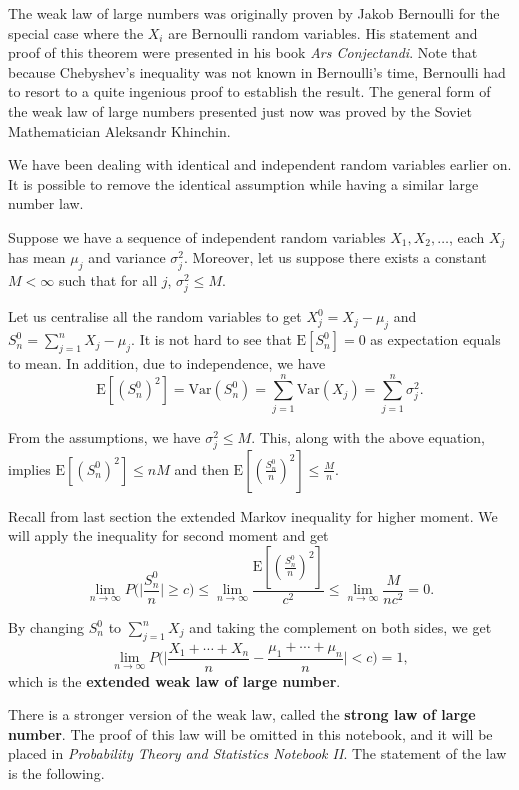 \documentclass[11pt, a4paper, oneside]{book}
\theoremstyle{definition}
\newcommand{\var}[1]{\text{Var}(#1)}
\newcommand{\E}[1]{\text{E}[#1]}
\begin{document}
\noindent The weak law of large numbers was originally proven by Jakob Bernoulli for the special case where the $X_i$ are Bernoulli random variables. His statement and proof of this theorem were presented in his book \emph{Ars Conjectandi}. Note that because Chebyshev’s inequality was not known in Bernoulli’s time, Bernoulli had to resort to a quite ingenious proof to establish the result. The general form of the weak law of large numbers presented just now was proved by the Soviet Mathematician Aleksandr Khinchin.

\noindent We have been dealing with identical and independent random variables earlier on. It is possible to remove the identical assumption while having a similar large number law. 

\noindent Suppose we have a sequence of independent random variables $X_1, X_2, \dots$, each $X_j$ has mean $\mu_j$ and variance $\sigma^2_j$. Moreover, let us suppose there exists a constant $M < \infty$ such that for all $j$, $\sigma^2_j \le M$.

\noindent Let us centralise all the random variables to get $X_j^0 = X_j - \mu_j$ and $S_n^0 =\sum_{j=1}^n X_j - \mu_j$. It is not hard to see that $\E{S_n^0} = 0$ as expectation equals to mean. In addition, due to independence, we have\[
\E{(S_n^0)^2} = \var{S_n^0} = \sum_{j=1}^n \var{X_j} = \sum_{j=1}^n \sigma^2_j.
\]

\noindent From the assumptions, we have $\sigma^2_j \le M$. This, along with the above equation, implies $\E{(S_n^0)^2} \le nM$ and then $\E{(\frac{S_n^0}{n})^2} \le \frac{M}{n}$.

\noindent Recall from last section the extended Markov inequality for higher moment. We will apply the inequality for second moment and get\[
\lim_{n \to \infty} P\Big( \Big\vert \frac{S_n^0}{n} \Big\vert \ge c \Big) \le \lim_{n \to \infty} \frac{\E{(\frac{S_n^0}{n})^2}}{c^2} \le \lim_{n \to \infty} \frac{M}{nc^2} = 0.
\]

\noindent By changing $S_n^0$ to $\sum_{j=1}^n X_j$ and taking the complement on both sides, we get \[
\lim_{n \to \infty} P\Big(\Big\vert \frac{X_1 + \cdots + X_n}{n} - \frac{\mu_1 + \cdots + \mu_n}{n} \Big\vert < c\Big) = 1,
\] 
which is the \textbf{extended weak law of large number}. 

\noindent There is a stronger version of the weak law, called the \textbf{strong law of large number}. The proof of this law will be omitted in this notebook, and it will be placed in  \emph{Probability Theory and Statistics Notebook II}. The statement of the law is the following. 
\end{document}
